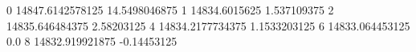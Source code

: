0 14847.6142578125 14.5498046875
1 14834.6015625 1.537109375
2 14835.646484375 2.58203125
4 14834.2177734375 1.1533203125
6 14833.064453125 0.0
8 14832.919921875 -0.14453125
